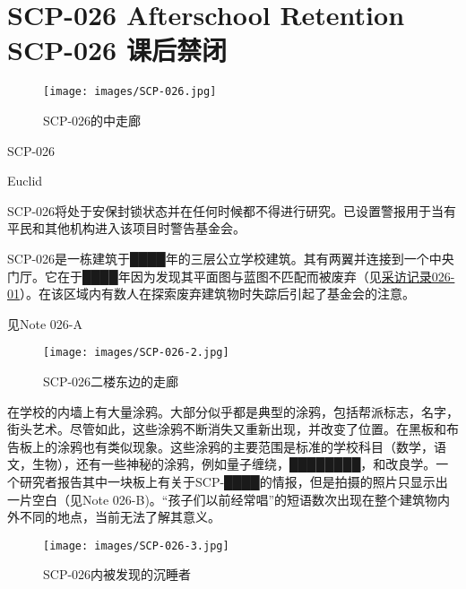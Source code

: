 \chapter[SCP-026 课后禁闭]{
    SCP-026 Afterschool Retention\\
    SCP-026 课后禁闭
}

\label{chap:SCP-026}

\begin{figure}[H]
    \centering
    \texttt{[image: images/SCP-026.jpg]}
    \caption*{SCP-026的中走廊}
\end{figure}

SCP-026

Euclid

SCP-026将处于安保封锁状态并在任何时候都不得进行研究。已设置警报用于当有平民和其他机构进入该项目时警告基金会。

SCP-026是一栋建筑于████年的三层公立学校建筑。其有两翼并连接到一个中央门厅。它在于████年因为发现其平面图与蓝图不匹配而被废弃（见\hyperref[sec:DOC-interview-log-026-01]{采访记录026-01}）。在该区域内有数人在探索废弃建筑物时失踪后引起了基金会的注意。


见Note 026-A

\begin{figure}[H]
    \centering
    \texttt{[image: images/SCP-026-2.jpg]}
    \caption*{SCP-026二楼东边的走廊}
\end{figure}

在学校的内墙上有大量涂鸦。大部分似乎都是典型的涂鸦，包括帮派标志，名字，街头艺术。尽管如此，这些涂鸦不断消失又重新出现，并改变了位置。在黑板和布告板上的涂鸦也有类似现象。这些涂鸦的主要范围是标准的学校科目（数学，语文，生物），还有一些神秘的涂鸦，例如量子缠绕，████████，和改良学。一个研究者报告其中一块板上有关于SCP-████的情报，但是拍摄的照片只显示出一片空白（见Note 026-B)。“孩子们以前经常唱”的短语数次出现在整个建筑物内外不同的地点，当前无法了解其意义。

\begin{figure}[H]
    \centering
    \texttt{[image: images/SCP-026-3.jpg]}
    \caption*{SCP-026内被发现的沉睡者}
\end{figure}

